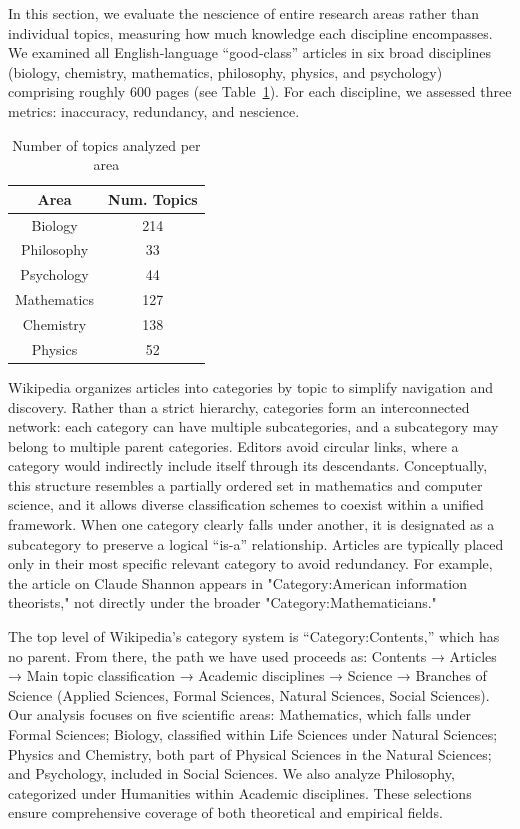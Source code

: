 In this section, we evaluate the nescience of entire research areas rather than individual topics, measuring how much knowledge each discipline encompasses. We examined all English‑language “good‑class” articles in six broad disciplines (biology, chemistry, mathematics, philosophy, physics, and psychology) comprising roughly 600 pages (see Table \ref{tab:num_topics_per_area}). For each discipline, we assessed three metrics: inaccuracy, redundancy, and nescience.

\begin{table}
\begin{centering}
\begin{tabular}{|c|c|}
\hline 
Area & Num. Topics \tabularnewline
\hline 
\hline
Biology & 214 \tabularnewline
\hline
Philosophy & 33 \tabularnewline
\hline
Psychology & 44 \tabularnewline
\hline
Mathematics & 127 \tabularnewline
\hline
Chemistry & 138 \tabularnewline
\hline
Physics & 52 \tabularnewline
\hline
\end{tabular}
\par\end{centering}
\caption{\label{tab:num_topics_per_area}Number of topics analyzed per area}
\end{table}

Wikipedia organizes articles into categories by topic to simplify navigation and discovery. Rather than a strict hierarchy, categories form an interconnected network: each category can have multiple subcategories, and a subcategory may belong to multiple parent categories. Editors avoid circular links, where a category would indirectly include itself through its descendants. Conceptually, this structure resembles a partially ordered set in mathematics and computer science, and it allows diverse classification schemes to coexist within a unified framework. When one category clearly falls under another, it is designated as a subcategory to preserve a logical “is-a” relationship. Articles are typically placed only in their most specific relevant category to avoid redundancy. For example, the article on Claude Shannon appears in "Category:American information theorists," not directly under the broader "Category:Mathematicians."

The top level of Wikipedia's category system is “Category:Contents,” which has no parent. From there, the path we have used proceeds as: Contents → Articles → Main topic classification → Academic disciplines → Science → Branches of Science (Applied Sciences, Formal Sciences, Natural Sciences, Social Sciences). Our analysis focuses on five scientific areas: Mathematics, which falls under Formal Sciences; Biology, classified within Life Sciences under Natural Sciences; Physics and Chemistry, both part of Physical Sciences in the Natural Sciences; and Psychology, included in Social Sciences. We also analyze Philosophy, categorized under Humanities within Academic disciplines. These selections ensure comprehensive coverage of both theoretical and empirical fields.

